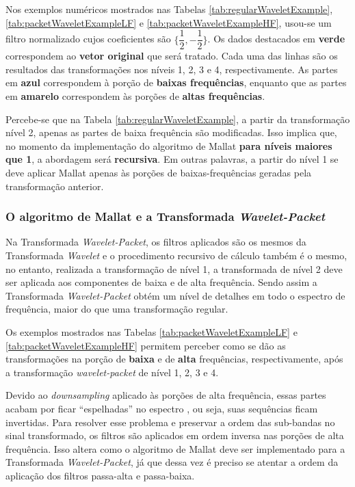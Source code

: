 			\par Nos exemplos numéricos mostrados nas Tabelas \ref{tab:regularWaveletExample}, \ref{tab:packetWaveletExampleLF} e \ref{tab:packetWaveletExampleHF}, usou-se um filtro normalizado cujos coeficientes são $\{\dfrac{1}{2},-\dfrac{1}{2}\}$. Os dados destacados em \textbf{verde} correspondem ao \textbf{vetor original} que será tratado. Cada uma das linhas são os resultados das transformações nos níveis 1, 2, 3 e 4, respectivamente. As partes em \textbf{azul} correspondem à porção de \textbf{baixas frequências}, enquanto que as partes em \textbf{amarelo} correspondem às porções de \textbf{altas frequências}.
			
			\par Percebe-se que na Tabela \ref{tab:regularWaveletExample}, a partir da transformação nível 2, apenas as partes de baixa frequência são modificadas. Isso implica que, no momento da implementação do algoritmo de Mallat \textbf{para níveis maiores que 1}, a abordagem será \textbf{recursiva}. Em outras palavras, a partir do nível 1 se deve aplicar Mallat apenas às porções de baixas-frequências geradas pela transformação anterior.
	
			
	
		\subsubsection{O algoritmo de Mallat e a Transformada \textit{Wavelet-Packet}}
			\par Na Transformada \textit{Wavelet-Packet}, os filtros aplicados são os mesmos da Transformada \textit{Wavelet} e o procedimento recursivo de cálculo também é o mesmo, no entanto, realizada a transformação de nível 1, a transformada de nível 2 deve ser aplicada aos componentes de baixa e de alta frequência. Sendo assim a Transformada \textit{Wavelet-Packet} obtém um nível de detalhes em todo o espectro de frequência, maior do que uma transformação regular. 
			
			\par Os exemplos mostrados nas Tabelas \ref{tab:packetWaveletExampleLF} e \ref{tab:packetWaveletExampleHF} permitem perceber como se dão as transformações na porção de \textbf{baixa} e de \textbf{alta} frequências, respectivamente, após a transformação \textit{wavelet-packet} de nível 1, 2, 3 e 4.
			
			\par Devido ao \textit{downsampling} aplicado às porções de alta frequência, essas partes acabam por ficar ``espelhadas'' no espectro \cite{Jensen_2001}, ou seja, suas sequências ficam invertidas. Para resolver esse problema e preservar a ordem das sub-bandas no sinal transformado, os filtros são aplicados em ordem inversa nas porções de alta frequência. Isso altera como o algoritmo de Mallat deve ser implementado para a Transformada \textit{Wavelet-Packet}, já que dessa vez é preciso se atentar a ordem da aplicação dos filtros passa-alta e passa-baixa.
	
